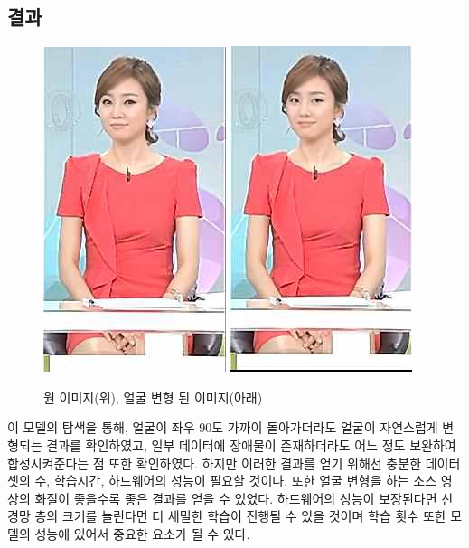 \documentclass[chapter,oneside]{oblivoir}
\begin{document}
    \subsection{결과}
    \begin{figure}[h!]
    \centering
        \includegraphics{pic/chp5/img907}
        \includegraphics{pic/chp5/img908}
    \caption{원 이미지(위), 얼굴 변형 된 이미지(아래)}
    \end{figure}

    이 모델의 탐색을 통해, 얼굴이 좌우 90도 가까이 돌아가더라도 얼굴이 자연스럽게 변형되는 결과를 확인하였고, 일부 데이터에 장애물이 존재하더라도 어느 정도 보완하여 합성시켜준다는 점 또한 확인하였다. 하지만 이러한 결과를 얻기 위해선 충분한 데이터 셋의 수, 학습시간, 하드웨어의 성능이 필요할 것이다. 또한 얼굴 변형을 하는 소스 영상의 화질이 좋을수록 좋은 결과를 얻을 수 있었다. 하드웨어의 성능이 보장된다면 신경망 층의 크기를 늘린다면 더 세밀한 학습이 진행될 수 있을 것이며 학습 횟수 또한 모델의 성능에 있어서 중요한 요소가 될 수 있다.
\end{document}
